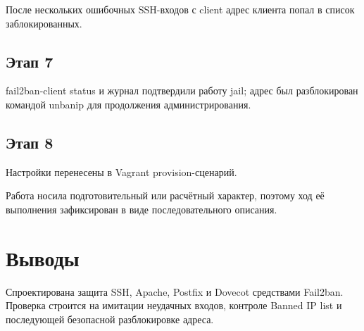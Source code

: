 \documentclass[
  english,
  russian,
  12pt,
  a4paper,
  DIV=11,
  numbers=noendperiod]{scrreprt}
\begin{document}
После нескольких ошибочных SSH-входов с client адрес клиента попал в
список заблокированных.

\section{Этап 7}\label{ux44dux442ux430ux43f-7}

fail2ban-client status и журнал подтвердили работу jail; адрес был
разблокирован командой unbanip для продолжения администрирования.

\section{Этап 8}\label{ux44dux442ux430ux43f-8}

Настройки перенесены в Vagrant provision-сценарий.

Работа носила подготовительный или расчётный характер, поэтому ход её
выполнения зафиксирован в виде последовательного описания.

\chapter{Выводы}\label{ux432ux44bux432ux43eux434ux44b}

Спроектирована защита SSH, Apache, Postfix и Dovecot средствами
Fail2ban. Проверка строится на имитации неудачных входов, контроле
Banned IP list и последующей безопасной разблокировке адреса.


\printbibliography
\end{document}
